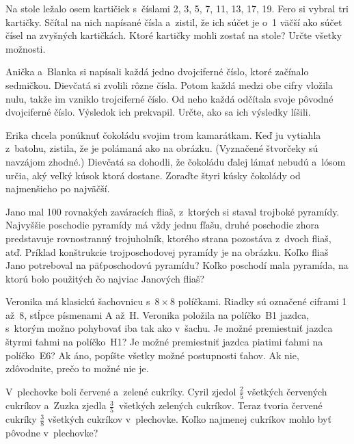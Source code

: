 {%
Na stole ležalo osem kartičiek s~číslami 2, 3, 5, 7, 11, 13, 17, 19.
Fero si vybral tri kartičky.
Sčítal na nich napísané čísla a~zistil, že ich súčet je o~1 väčší ako súčet čísel na zvyšných kartičkách.
Ktoré kartičky mohli zostať na stole?
Určte všetky možnosti.}

{%
Anička a~Blanka si napísali každá jedno dvojciferné číslo, ktoré začínalo sedmičkou.
Dievčatá si zvolili rôzne čísla.
Potom každá medzi obe cifry vložila nulu, takže im vzniklo trojciferné číslo.
Od neho každá odčítala svoje pôvodné dvojciferné číslo.
Výsledok ich prekvapil.
Určte, ako sa ich výsledky líšili.}

{%
Erika chcela ponúknuť čokoládu svojim trom kamarátkam.
Keď ju vytiahla z~batohu, zistila, že je polámaná ako na obrázku.
(Vyznačené štvorčeky sú navzájom zhodné.)
Dievčatá sa dohodli, že čokoládu ďalej lámať nebudú a~lósom určia, aký veľký kúsok ktorá dostane.
Zoraďte štyri kúsky čokolády od najmenšieho po najväčší.
%
}

{%
Jano mal 100 rovnakých zaváracích fliaš, z~ktorých si staval trojboké pyramídy.
Najvyššie poschodie pyramídy má vždy jednu fľašu, druhé poschodie zhora predstavuje rovnostranný trojuholník, ktorého strana pozostáva z~dvoch fliaš, atď.
Príklad konštrukcie trojposchodovej pyramídy je na obrázku.
%
 Koľko fliaš Jano potreboval na päťposchodovú pyramídu?
 Koľko poschodí mala pyramída, na ktorú bolo použitých čo najviac Janových fliaš?
\endgraf
}

{%
Veronika má klasickú šachovnicu s~$8\times 8$ políčkami.
Riadky sú označené ciframi 1 až~8, stĺpce písmenami A až~H.
Veronika položila na políčko~B1 jazdca, s~ktorým možno pohybovať iba tak ako v~šachu.
 Je možné premiestniť jazdca štyrmi ťahmi na políčko~H1?
 Je možné premiestniť jazdca piatimi ťahmi na políčko~E6?
\endgraf\noindent
Ak áno, popíšte všetky možné postupnosti ťahov.
Ak nie, zdôvodnite, prečo to možné nie je.}

{%
V~plechovke boli červené a~zelené cukríky.
Cyril zjedol $\frac25$ všetkých červených cukríkov a~Zuzka zjedla $\frac35$~všetkých zelených cukríkov.
Teraz tvoria červené cukríky $\frac38$ všetkých cukríkov v~plechovke.
Koľko najmenej cukríkov mohlo byť pôvodne v~plechovke?
}

